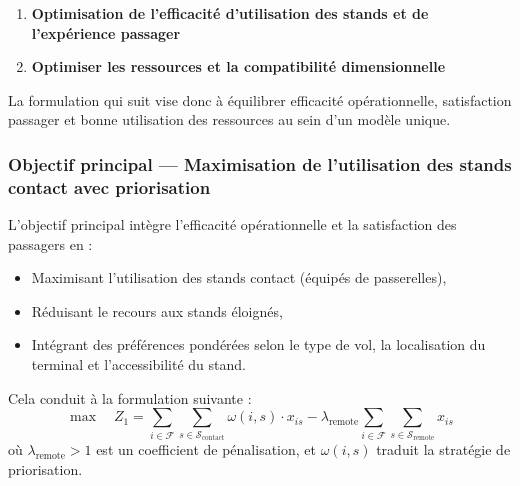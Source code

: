 \begin{tcolorbox}[colback=gray!10, colframe=gray,
	title={\textbf{Hiérarchie des objectifs opérationnels}}]
	\begin{enumerate}[label=\textbf{P\arabic*:}, leftmargin=2em]
		\item \textbf{	Optimisation de l’efficacité d’utilisation des stands et de l’expérience passager}
		\item \textbf{Optimiser les ressources et la compatibilité dimensionnelle}
	\end{enumerate}
\end{tcolorbox}


La formulation qui suit vise donc à équilibrer efficacité opérationnelle,
satisfaction passager et bonne utilisation des ressources au sein d’un
modèle unique.
\subsubsection{Objectif principal — Maximisation de l’utilisation des stands contact avec priorisation}
\label{sssec:primary_objective}

\begin{objective}  
	
	
	L’objectif principal intègre l’efficacité opérationnelle et la satisfaction des passagers en :
	\begin{itemize}[leftmargin=1.7em]
		\item Maximisant l’utilisation des stands contact (équipés de passerelles),
		\item Réduisant le recours aux stands éloignés,
		\item Intégrant des préférences pondérées selon le type de vol, la localisation du terminal et l’accessibilité du stand.
	\end{itemize}
	
	Cela conduit à la formulation suivante :
	\begin{equation}
		\boxed{
			\max \quad Z_1 = \sum_{i \in \mathcal{F}} \sum_{s \in \mathcal{S}_{\text{contact}}} \omega(i,s) \cdot x_{is} - \lambda_{\text{remote}} \sum_{i \in \mathcal{F}} \sum_{s \in \mathcal{S}_{\text{remote}}} x_{is}
		}
		\label{eq:refactored_primary}
	\end{equation}
	où $\lambda_{\text{remote}} > 1$ est un coefficient de pénalisation, et $\omega(i,s)$ traduit la stratégie de priorisation.
\end{objective}

